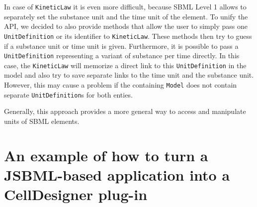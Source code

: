\documentclass[
  letterpaper,
  11pt,
  headsepline,
  pointlessnumbers,
  tablecaptionabove,
  headinclude,
  appendixprefix,
  idxtotoc,
  bibtotoc,
  titlepage
]{scrartcl}
\begin{document}
In case of \verb!KineticLaw! it is even more difficult, because
SBML Level 1 allows to separately set the substance unit and the time unit of
the element. To unify the API, we decided to also provide methods that allow
the user to simply pass one \verb!UnitDefinition! or its identifier to
\verb!KineticLaw!. These methods then try to guess if a substance unit or time
unit is given. Furthermore, it is possible to pass a \verb!UnitDefinition!
representing a variant of substance per time directly. In this case, the
\verb!KineticLaw! will memorize a direct link to this \verb!UnitDefinition! in
the model and also try to save separate links to the time unit and the substance
unit. However, this may cause a problem if the containing \verb!Model! does not
contain separate \verb!UnitDefinition!s for both enties.

Generally, this approach provides a more general way to access and manipulate
units of SBML elements.

\appendix

\section{An example of how to turn a JSBML-based application into a CellDesigner
plug-in}
\end{document}

